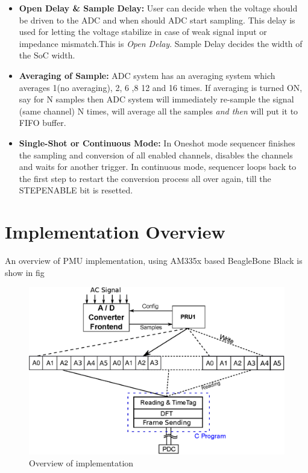\begin{itemize}
	\item \textbf{Open Delay \& Sample Delay:} User can decide when the voltage should be driven to the ADC and when should ADC start sampling. This delay is used for letting the voltage stabilize in case of weak signal input or impedance mismatch.This is \textit{Open Delay}. Sample Delay decides the width of the SoC width.
	\item \textbf{Averaging of Sample:} ADC system has an averaging system which averages 1(no averaging), 2, 6 ,8 12 and 16 times. If averaging is turned ON, say for N samples then ADC system will immediately re-sample the signal (same channel) N times, will average all the samples \textit{and then} will put it to FIFO buffer.
	\item \textbf{Single-Shot or Continuous Mode:} In Oneshot mode sequencer finishes the sampling and conversion of all enabled channels, disables the channels and waits for another trigger. In continuous mode, sequencer loops back to the first step to restart the conversion process all over again, till the STEPENABLE bit is resetted.    
\end{itemize} 

\section{Implementation Overview}
An overview of PMU implementation, using AM335x based BeagleBone Black is show in fig 
\begin{figure}
	\includegraphics[width=\textwidth]{fig/sys_overview.eps}
	\caption{Overview of implementation}
\end{figure}

